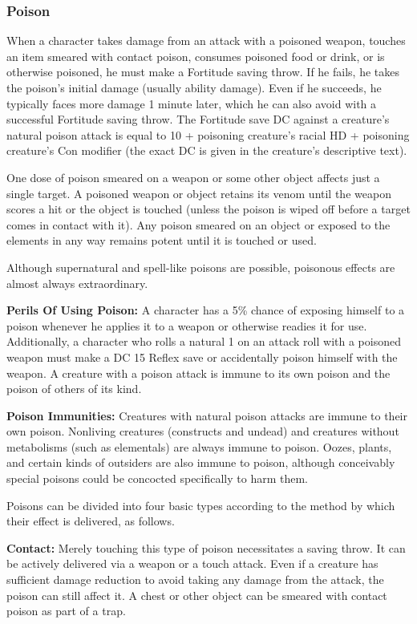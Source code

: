 \subsubsection{Poison}
When a character takes damage from an attack with a poisoned weapon, touches an item smeared with contact poison, consumes poisoned food or drink, or is otherwise poisoned, he must make a Fortitude saving throw. If he fails, he takes the poison's initial damage (usually ability damage). Even if he succeeds, he typically faces more damage 1 minute later, which he can also avoid with a successful Fortitude saving throw. The Fortitude save DC against a creature's natural poison attack is equal to 10 + \onehalf poisoning creature's racial HD + poisoning creature's Con modifier (the exact DC is given in the creature's descriptive text).

One dose of poison smeared on a weapon or some other object affects just a single target. A poisoned weapon or object retains its venom until the weapon scores a hit or the object is touched (unless the poison is wiped off before a target comes in contact with it). Any poison smeared on an object or exposed to the elements in any way remains potent until it is touched or used.

Although supernatural and spell-like poisons are possible, poisonous effects are almost always extraordinary.

\textbf{Perils Of Using Poison:} A character has a 5\% chance of exposing himself to a poison whenever he applies it to a weapon or otherwise readies it for use. Additionally, a character who rolls a natural 1 on an attack roll with a poisoned weapon must make a DC 15 Reflex save or accidentally poison himself with the weapon. A creature with a poison attack is immune to its own poison and the poison of others of its kind.

\textbf{Poison Immunities:} Creatures with natural poison attacks are immune to their own poison. Nonliving creatures (constructs and undead) and creatures without metabolisms (such as elementals) are always immune to poison. Oozes, plants, and certain kinds of outsiders are also immune to poison, although conceivably special poisons could be concocted specifically to harm them.

Poisons can be divided into four basic types according to the method by which their effect is delivered, as follows.

\textbf{Contact:} Merely touching this type of poison necessitates a saving throw. It can be actively delivered via a weapon or a touch attack. Even if a creature has sufficient damage reduction to avoid taking any damage from the attack, the poison can still affect it. A chest or other object can be smeared with contact poison as part of a trap.

